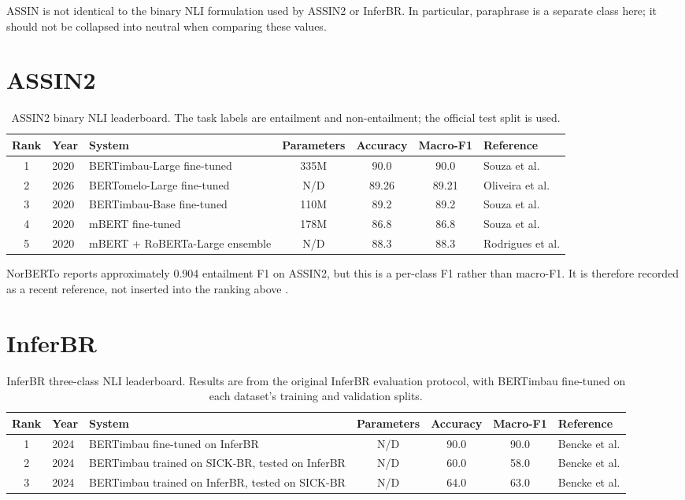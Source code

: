\documentclass[10pt]{article}
\begin{document}
ASSIN is not identical to the binary NLI formulation used by ASSIN2 or
InferBR. In particular, paraphrase is a separate class here; it should not be
collapsed into neutral when comparing these values.

\section*{ASSIN2}
\begin{longtable}{@{}c p{3.1cm} p{3.4cm} c c c p{3.0cm}@{}}
\caption{ASSIN2 binary NLI leaderboard. The task labels are entailment and
non-entailment; the official test split is used.}
\label{tab:assin2-literature}\\
\toprule
\textbf{Rank} & \textbf{Year} & \textbf{System} & \textbf{Parameters} & \textbf{Accuracy} & \textbf{Macro-F1} & \textbf{Reference} \\
\midrule
1 & 2020 & BERTimbau-Large fine-tuned & 335M & 90.0 & 90.0 & Souza et al. \cite{souza2020bertimbau} \\
2 & 2026 & BERTomelo-Large fine-tuned & N/D & 89.26 & 89.21 & Oliveira et al. \cite{oliveira2026bertomelo} \\
3 & 2020 & BERTimbau-Base fine-tuned & 110M & 89.2 & 89.2 & Souza et al. \cite{souza2020bertimbau} \\
4 & 2020 & mBERT fine-tuned & 178M & 86.8 & 86.8 & Souza et al. \cite{souza2020bertimbau} \\
5 & 2020 & mBERT + RoBERTa-Large ensemble & N/D & 88.3 & 88.3 & Rodrigues et al. \cite{rodrigues2020assin2} \\
\bottomrule
\end{longtable}

NorBERTo reports approximately 0.904 entailment F1 on ASSIN2, but this is a
per-class F1 rather than macro-F1. It is therefore recorded as a recent
reference, not inserted into the ranking above \cite{silva2026norberto}.

\section*{InferBR}
\begin{longtable}{@{}c p{3.2cm} p{3.5cm} c c c p{3.0cm}@{}}
\caption{InferBR three-class NLI leaderboard. Results are from the original
InferBR evaluation protocol, with BERTimbau fine-tuned on each dataset's
training and validation splits.}
\label{tab:inferbr-literature}\\
\toprule
\textbf{Rank} & \textbf{Year} & \textbf{System} & \textbf{Parameters} & \textbf{Accuracy} & \textbf{Macro-F1} & \textbf{Reference} \\
\midrule
1 & 2024 & BERTimbau fine-tuned on InferBR & N/D & 90.0 & 90.0 & Bencke et al. \cite{bencke2024inferbr} \\
2 & 2024 & BERTimbau trained on SICK-BR, tested on InferBR & N/D & 60.0 & 58.0 & Bencke et al. \cite{bencke2024inferbr} \\
3 & 2024 & BERTimbau trained on InferBR, tested on SICK-BR & N/D & 64.0 & 63.0 & Bencke et al. \cite{bencke2024inferbr} \\
\bottomrule
\end{longtable}
\end{document}
